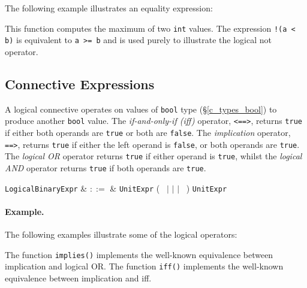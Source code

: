 The following example illustrates an equality expression:



This function computes the maximum of two \lstinline{int} values.  The expression \lstinline{!(a < b)} is equivalent to \lstinline{a >= b} and is used purely to illustrate the logical not operator.


\subsection{Connective Expressions}
\label{c_expr_logical_binary}

A logical connective operates on values of \lstinline{bool} type (\S\ref{c_types_bool}) to produce another \lstinline{bool} value.  The {\em if-and-only-if (iff)} operator, \lstinline{<==>}, returns \lstinline{true} if either both operands are \lstinline{true} or both are \lstinline{false}.  The {\em implication} operator, \lstinline{==>}, returns \lstinline{true} if either the left operand is \lstinline{false}, or both operands are \lstinline{true}.  The {\em logical OR} operator returns \lstinline{true} if either operand is \lstinline{true}, whilst the {\em logical AND} operator returns \lstinline{true} if both operands are \lstinline{true}.

\begin{syntax}

  \verb+LogicalBinaryExpr+ & $::=$ & \verb+UnitExpr+ \big(\ \token{<==>} $|$ \token{==>} $|$ \token{\&\&} $|$ \token{||}\ \big) \verb+UnitExpr+\\
\end{syntax}

\paragraph{Example.}  The following examples illustrate some of the logical operators:



The function \lstinline{implies()} implements the well-known equivalence between implication and logical OR.  The function \lstinline{iff()} implements the well-known equivalence between implication and iff.

